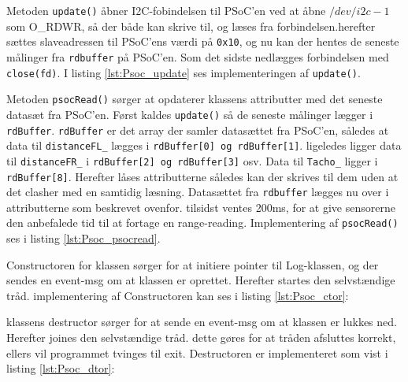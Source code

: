 Metoden \texttt{update()} åbner I2C-fobindelsen til PSoC'en ved at åbne $/dev/i2c-1$ som O\_RDWR, så der både kan skrive til, og læses fra forbindelsen.herefter sættes slaveadressen til PSoC'ens værdi på \texttt{0x10}, og nu kan der hentes de seneste målinger fra \texttt{rdbuffer} på PSoC'en. Som det sidste nedlægges forbindelsen med \texttt{close(fd)}. I listing \ref{lst:Psoc_update} ses implementeringen af \texttt{update()}.




Metoden \texttt{psocRead()} sørger at opdaterer klassens attributter med det seneste datasæt fra PSoC'en. Først kaldes \texttt{update()} så de seneste målinger lægger i \texttt{rdBuffer}. \texttt{rdBuffer} er det array der samler datasættet fra PSoC'en, således at data til \texttt{distanceFL\_} lægges i \texttt{rdBuffer[0] og rdBuffer[1]}. ligeledes ligger data til \texttt{distanceFR\_} i \texttt{rdBuffer[2] og rdBuffer[3]} osv. Data til \texttt{Tacho\_} ligger i \texttt{rdBuffer[8]}. Herefter låses attributterne således kan der skrives til dem uden at det clasher med en samtidig læsning. Datasættet fra \texttt{rdbuffer} lægges nu over i attributterne som beskrevet ovenfor. tilsidst ventes 200ms, for at give sensorerne den anbefalede tid til at fortage en range-reading. Implementering af \texttt{psocRead()} ses i listing \ref{lst:Psoc_psocread}.




Constructoren for klassen sørger for at initiere pointer til Log-klassen, og der sendes en event-msg om at klassen er oprettet. Herefter startes den selvstændige tråd. implementering af Constructoren kan ses i listing \ref{lst:Psoc_ctor}:




klassens destructor sørger for at sende en event-msg om at klassen er lukkes ned. Herefter joines den selvstændige tråd. dette gøres for at tråden afsluttes korrekt, ellers vil programmet tvinges til exit. Destructoren er implementeret som vist i listing \ref{lst:Psoc_dtor}:


